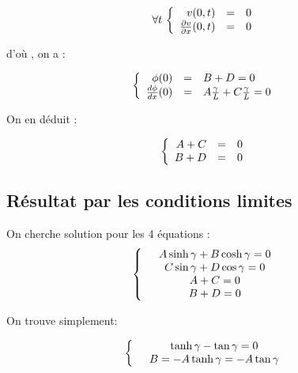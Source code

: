 \documentclass[a4paper,10pt]{report} %
\begin{document}
\begin{equation}
    \forall t\,
    \left \{
    \begin{array}{r c l}v(0,t)&=&0\\\frac{\partial v}{\partial x}(0,t)&=&0
    \end{array}
    \right.
\end{equation}

d'où , on a :

\begin{equation}
    \left\{
    \begin{array}{r c l}
    \phi (0)&=&B+D=0\\\frac{d\phi}{dx}(0)&=&A\frac{\gamma}{L}+C\frac{\gamma}{L}=0
    \end{array}
    \right.
\end{equation}

On en déduit :

\begin{equation}
    \left\{
    \begin{array}{r c l}
    A+C&=&0\\
    B+D&=&0
    \end{array}
    \right.
\end{equation}


\subsection{Résultat par les conditions limites}

On cherche solution pour les 4 équations :
\begin{equation}
    \left\{
    \begin{array}{r c l}
    &A\sinh{\gamma}+B\cosh{\gamma}=0\\
    &C\sin{\gamma}+D\cos{\gamma}=0\\
    &A+C=0\\
    &B+D=0
    \end{array}
    \right.
\end{equation}

On trouve simplement:


\begin{equation}
    \left\{
    \begin{array}{r c l}
    &\tanh{\gamma}-\tan{\gamma}=0\\
    &B=-A\tanh{\gamma}=-A\tan{\gamma}
    \end{array}
    \right.
\end{equation}

\end{document}
